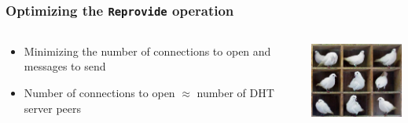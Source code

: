 \documentclass{../pl-slide}
\begin{document}
\begin{frame}
\frametitle{Optimizing the \texttt{Reprovide} operation}

\begin{columns}[onlytextwidth]
	\begin{column}{0.69\textwidth}
		\begin{itemize}
			\itemc More CIDs to reprovide than DHT Servers
			\itemc $\Rightarrow $ multiple CIDs are allocated on the same DHT Server
			\itemc Group CIDs allocated on the same DHT Server and reprovide them sequentially
			\itemc Periodically sweep the keyspace and reprovide CIDs
			\vspace{2em}
			\item[\greencube] Minimizing the number of connections to open and messages to send
			\item[\greencube] Number of connections to open $\approx$ number of DHT server peers
		\end{itemize}
	\end{column}
	\begin{column}{0.29\textwidth}
    		\begin{center}
        		\includegraphics[width=10em]{resources/pigeonhole.jpg}
    		\end{center}
	\end{column}
\end{columns}
\end{frame}

\end{document}
